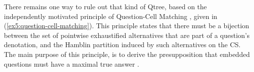 There remains one way to rule out that kind of Qtree, based on the independently motivated principle of Question-Cell Matching \citep{Fox2018}, given in (\ref{ex5:question-cell-matching}). This principle states that there must be a bijection between the set of pointwise exhaustified alternatives that are part of a question's denotation, and the Hamblin partition induced by such alternatives on the CS. The main purpose of this principle, is  to derive the presupposition that embedded questions must have a maximal true answer \citep{Dayal1996}.

\begin{exe}
	\label{ex5:question-cell-matching}
\end{exe}

